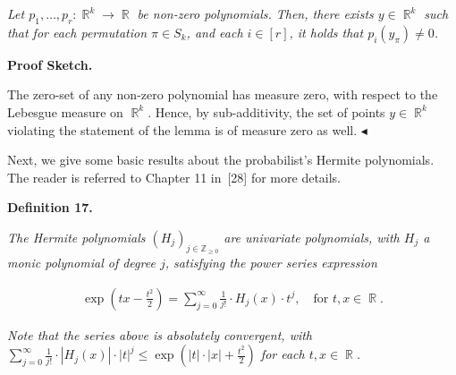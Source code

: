 \emph{Let $p_{1},\dots,p_{r}:\mathop{\mathbb{R}}^{k}\to\mathop{\mathbb{R}}$ be non-zero polynomials.
Then, there exists $y\in\mathop{\mathbb{R}}^{k}$ such that for each permutation $\pi\in S_{k}$, and each $i\in[r]$, it holds that $p_{i}(y_{\pi})\not=0$.}\par






\par\medskip\noindent\textbf{Proof Sketch.}\par




The zero-set of any non-zero polynomial has measure zero, with respect to the Lebesgue measure on $\mathop{\mathbb{R}}^{k}$.
Hence, by sub-additivity, the set of points $y\in\mathop{\mathbb{R}}^{k}$ violating the statement of the lemma is of measure zero as well.
$\blacktriangleleft$\par




Next, we give some basic results about the probabilist’s Hermite polynomials. The reader is referred to Chapter 11 in [28] for more details.\par





\par\medskip\noindent\textbf{
\textbf{Definition 17}\textbf{.}
}\par



\emph{The Hermite polynomials $(H_{j})_{j\in\mathbb{Z}_{\geqslant 0}}$ are univariate polynomials, with $H_{j}$ a monic polynomial of degree $j$, satisfying the power series expression}\par


\[\begin{gathered}
\exp\left(tx-\frac{t^{2}}{2}\right)=\sum_{j=0}^{\infty}\frac{1}{j!}\cdot H_{j}(x)\cdot t^{j},\quad\text{for }t,x\in\mathop{\mathbb{R}}.
\end{gathered}\]


\emph{Note that the series above is absolutely convergent, with $\sum_{j=0}^{\infty}\frac{1}{j!}\cdot\left|H_{j}(x)\right|\cdot\left|t\right|^{j}\leqslant\exp\left(\left|t\right|\cdot\left|x\right|+\frac{t^{2}}{2}\right)$ for each $t,x\in\mathop{\mathbb{R}}$.}\par



